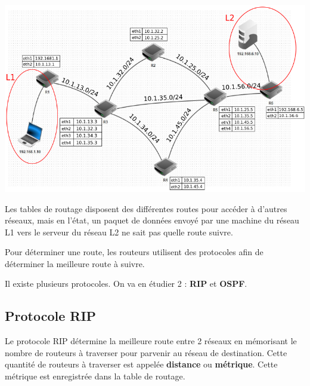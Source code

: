 \documentclass[11pt,a4paper]{article}
\begin{document}




\begin{center}
\includegraphics[scale=0.84]{../img/reseau_complet.png}
\end{center}

Les tables de routage disposent des différentes routes pour accéder à d'autres réseaux, mais en l'état, un paquet de données envoyé par une machine du réseau L1 vers le serveur du réseau L2 ne sait pas quelle route suivre. 

Pour déterminer une route, les routeurs utilisent des protocoles afin de déterminer la meilleure route à suivre.

Il existe plusieurs protocoles. On va en étudier 2 : \textbf{RIP} et \textbf{OSPF}.


\subsection*{Protocole RIP}

Le protocole RIP détermine la meilleure route entre 2 réseaux en mémorisant le nombre de routeurs à traverser pour parvenir au réseau de destination. Cette quantité de routeurs à traverser est appelée \textbf{distance} ou \textbf{métrique}. Cette métrique est enregistrée dans la table de routage.
\end{document}

